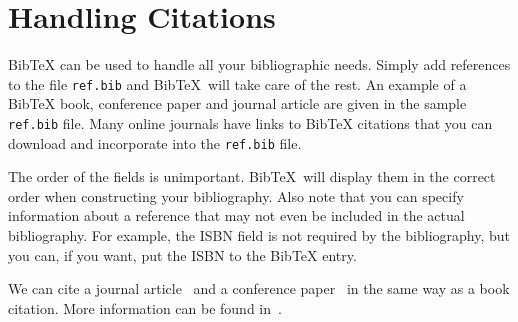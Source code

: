 \chapter{Handling Citations}
\label{chap:refs}

\newcommand{\BibTeX}{Bib\TeX}

\BibTeX{} can be used to handle all your bibliographic needs.  Simply add
references to the file \texttt{ref.bib} and \BibTeX\ will take care of
the rest.  An example of a \BibTeX{} book, conference paper and journal
article are given in the sample \texttt{ref.bib} file.  Many online
journals have links to \BibTeX{} citations that you can download and
incorporate into the \texttt{ref.bib} file.

The order of the fields is unimportant. \BibTeX\ will display them
in the correct order when constructing your bibliography.  Also note
that you can specify information about a reference that may not even be
included in the actual bibliography.  For example, the ISBN field is not
required by the bibliography, but you can, if you want, put the ISBN to
the \BibTeX{} entry.

We can cite a journal article~\cite{someguy2002} and a conference
paper~\cite{LastName1996} in the same way as a book citation.  More
information can be found in~\cite{lam1994}.
